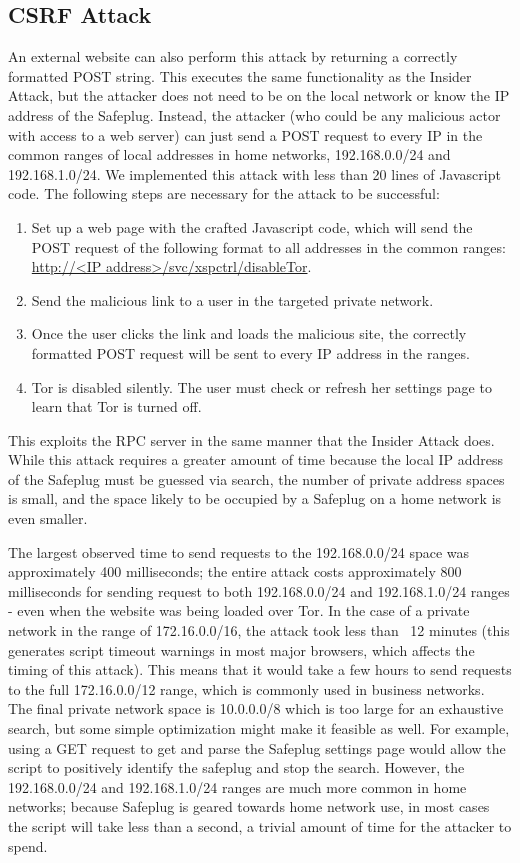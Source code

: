 \documentclass[conference]{IEEEtran}
\begin{document}
\subsection{CSRF Attack}
An external website can also perform this attack by returning a correctly formatted POST string.  This executes the same functionality as the Insider Attack, but the attacker does not need to be on the local network or know the IP address of the Safeplug.  Instead, the attacker (who could be any malicious actor with access to a web server) can just send a POST request to every IP in the common ranges of local addresses in home networks, 192.168.0.0/24 and 192.168.1.0/24.  We implemented this attack with less than 20 lines of Javascript code.  The following steps are necessary for the attack to be successful:

\begin{enumerate}
\item Set up a web page with the crafted Javascript code, which will send the POST request of the following format to all addresses in the common ranges: \url{http://<IP address>/svc/xspctrl/disableTor}.
\item Send the malicious link to a user in the targeted private network.
\item Once the user clicks the link and loads the malicious site, the correctly formatted POST request will be sent to every IP address in the ranges.  
\item Tor is disabled silently.  The user must check or refresh her settings page to learn that Tor is turned off.  
\end{enumerate}  

This exploits the RPC server in the same manner that the Insider Attack does.  While this attack requires a greater amount of time because the local IP address of the Safeplug must be guessed via search, the number of private address spaces is small, and the space likely to be occupied by a Safeplug on a home network is even smaller.  

The largest observed time to send requests to the 192.168.0.0/24 space was approximately 400 milliseconds; the entire attack costs approximately 800 milliseconds for sending request to both 192.168.0.0/24 and 192.168.1.0/24 ranges - even when the website was being loaded over Tor.  In the case of a private network in the range of 172.16.0.0/16, the attack took less than ~12 minutes (this generates script timeout warnings in most major browsers, which affects the timing of this attack).  This means that it would take a few hours to send requests to the full 172.16.0.0/12 range, which is commonly used in business networks.  The final private network space is 10.0.0.0/8 which is too large for an exhaustive search, but some simple optimization might make it feasible as well.  For example, using a GET request to get and parse the Safeplug settings page would allow the script to positively identify the safeplug and stop the search.  However, the 192.168.0.0/24 and 192.168.1.0/24 ranges are much more common in home networks; because Safeplug is geared towards home network use, in most cases the script will take less than a second, a trivial amount of time for the attacker to spend.  
\end{document}

